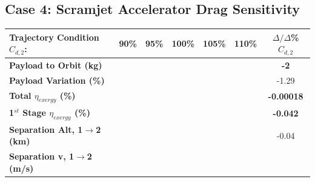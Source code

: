 \subsection{Case 4: Scramjet Accelerator Drag Sensitivity}\label{sec:dragvariation}

\begin{table}[ht!] %
	\centering
	\begin{tabular}{l c c c c c c} 
		\hline \textbf{Trajectory Condition}   \qquad  $C_{d,2}$: 
		&90\%
		&95\%
		&100\%
		&105\%
		&110\%
		& $\Delta/\Delta$\%$C_{d,2}$
		\\
		\hline \textbf{Payload to Orbit (kg)}
		& \textbf{\PayloadToOrbitCdNinetyNoReturn}
		& \textbf{\PayloadToOrbitCdNinetyFiveNoReturn}
		& \textbf{\PayloadToOrbitCdStandardNoReturn}
		& \textbf{\PayloadToOrbitCdOneHundredFiveNoReturn}
		& \textbf{\PayloadToOrbitCdOneHundredTenNoReturn}
		&\textbf{-2}
		\\
		\textbf{Payload Variation (\%)}
		& \PayloadVarCdNinetyNoReturn
		& \PayloadVarCdNinetyFiveNoReturn
		& \PayloadVarCdStandardNoReturn
		& \PayloadVarCdOneHundredFiveNoReturn
		& \PayloadVarCdOneHundredTenNoReturn
		&-1.29
		\\
		\textbf{Total $\eta_{exergy}$ (\%)}
		& \textbf{\totalExergyEffCdNinetyNoReturn}
		& \textbf{\totalExergyEffCdNinetyFiveNoReturn}
		& \textbf{\totalExergyEffCdStandardNoReturn}
		& \textbf{\totalExergyEffCdOneHundredFiveNoReturn}
		& \textbf{\totalExergyEffCdOneHundredTenNoReturn}
		& \textbf{-0.00018}
		\\
		\hline 
		\textbf{1$^{st}$ Stage $\eta_{exergy}$ (\%)}
		& \textbf{\firstExergyEffCdNinetyNoReturn}
		& \textbf{\firstExergyEffCdNinetyFiveNoReturn}
		& \textbf{\firstExergyEffCdStandardNoReturn}
		& \textbf{\firstExergyEffCdOneHundredFiveNoReturn}
		& \textbf{\firstExergyEffCdOneHundredTenNoReturn}
		& \textbf{-0.042}
		\\
		\textbf{Separation Alt, 1$\rightarrow$2 (km)}
		& \firstsecondSeparationAltCdNinetyNoReturn
		& \firstsecondSeparationAltCdNinetyFiveNoReturn
		& \firstsecondSeparationAltCdStandardNoReturn
		& \firstsecondSeparationAltCdOneHundredFiveNoReturn
		& \firstsecondSeparationAltCdOneHundredTenNoReturn
		&-0.04
		\\
		\textbf{Separation v, 1$\rightarrow$2 (m/s)}
		& \firstsecondSeparationvCdNinetyNoReturn
		& \firstsecondSeparationvCdNinetyFiveNoReturn
		& \firstsecondSeparationvCdStandardNoReturn
		& \firstsecondSeparationvCdOneHundredFiveNoReturn
		& \firstsecondSeparationvCdOneHundredTenNoReturn

\end{tabular}
\end{table}
